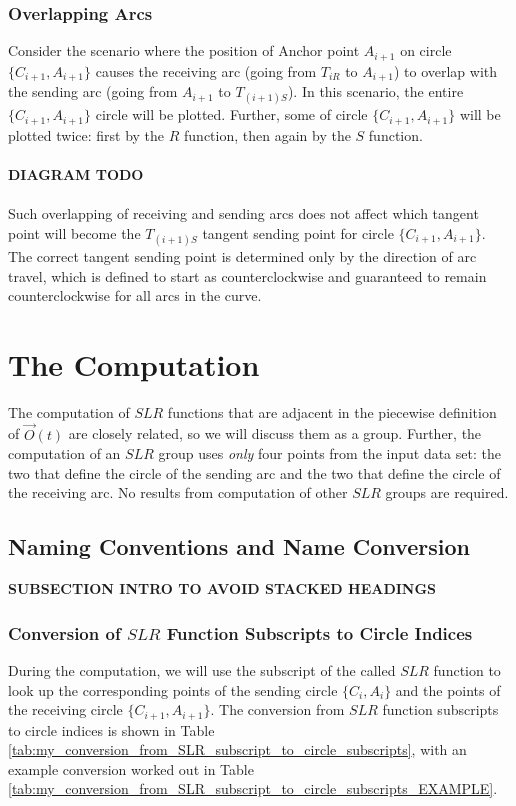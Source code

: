 \documentclass{article}
\begin{document}
\subsubsection{Overlapping Arcs}
Consider the scenario where the position of Anchor point $A_{i+1}$ on circle $\{C_{i+1}, A_{i+1}\}$ causes the receiving arc (going from $T_{iR}$ to $A_{i+1}$) to overlap with the sending arc (going from $A_{i+1}$ to $T_{(i+1)S}$). In this scenario, the entire $\{C_{i+1}, A_{i+1}\}$ circle will be plotted. Further, some of circle $\{C_{i+1}, A_{i+1}\}$ will be plotted twice: first by the $R$ function, then again by the $S$ function.\\ \\
\textbf{DIAGRAM TODO}\\ \\
Such overlapping of receiving and sending arcs does not affect which tangent point will become the $T_{(i+1)S}$ tangent sending point for circle $\{C_{i+1}, A_{i+1}\}$. The correct tangent sending point is determined only by the direction of arc travel, which is defined to start as counterclockwise and guaranteed to remain counterclockwise for all arcs in the curve.

\section{The Computation}
\label{sec:the_computation}
The computation of $SLR$ functions that are adjacent in the piecewise definition of $\overrightarrow{O}(t)$ are closely related, so we will discuss them as a group. Further, the computation of an $SLR$ group uses \textit{only} four points from the input data set: the two that define the circle of the sending arc and the two that define the circle of the receiving arc. No results from computation of other $SLR$ groups are required.

\subsection{Naming Conventions and Name Conversion}
\textbf{SUBSECTION INTRO TO AVOID STACKED HEADINGS}
\subsubsection{Conversion of $SLR$ Function Subscripts to Circle Indices}
\label{subsubsec:SLR_subscript_conversion}
During the computation, we will use the subscript of the called $SLR$ function to look up the corresponding points of the sending circle $\{C_i, A_i\}$ and the points of the receiving circle $\{C_{i+1}, A_{i+1}\}$. The conversion from $SLR$ function subscripts to circle indices is shown in Table \ref{tab:my_conversion_from_SLR_subscript_to_circle_subscripts}, with an example conversion worked out in Table \ref{tab:my_conversion_from_SLR_subscript_to_circle_subscripts_EXAMPLE}.
\end{document}
